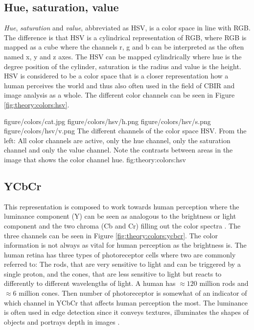 \subsection{Hue, saturation, value}
\label{sec:HSV_theory}
\emph{Hue}, \emph{saturation} and \emph{value}, abbreviated as HSV, is a color space in line with RGB. The difference is that HSV is a cylindrical representation of RGB, where RGB is mapped as a cube where the channels r, g and b can be interpreted as the often named x, y and z axes. The HSV can be mapped cylindrically where hue is the degree position of the cylinder, saturation is the radius and value is the height. HSV is considered to be a color space that is a closer representation how a human perceives the world and thus also often used in the field of CBIR and image analysis as a whole. The different color channels can be seen in Figure \ref{fig:theory:colors:hsv}.


\fourfigure
{figure/colors/cat.jpg}
{figure/colors/hsv/h.png}
{figure/colors/hsv/s.png}
{figure/colors/hsv/v.png}
{The different channels of the color space HSV. From the left: All color channels are active, only the hue channel, only the saturation channel and only the value channel. Note the contrasts between areas in the image that shows the color channel hue.}
{fig:theory:colors:hsv} 

\subsection{YCbCr}
\label{sec:ycbcr}
This representation is composed to work towards human perception where the luminance component (Y) can be seen as analogous to the brightness or light component and the two chroma (Cb and Cr) filling out the color spectra \cite{midha2014analysis}. The three channels can be seen in Figure \ref{fig:theory:colors:ycbcr}.
The color information is not always as vital for human perception as the brightness is. The human retina has three types of photoreceptor cells where two are commonly referred to: The rods, that are very sensitive to light and can be triggered by a single proton, and the cones, that are less sensitive to light but reacts to differently to different wavelengths of light. A human has $\approx120$ million rods and $\approx6$ million cones. Then number of photoreceptor is somewhat of an indicator of which channel in YCbCr that affects human perception the most. 
The luminance is often used in edge detection since it conveys textures, illuminates the shapes of objects and portrays depth in images \cite{su2011coldimage}\cite{prajapatiedge}. 

